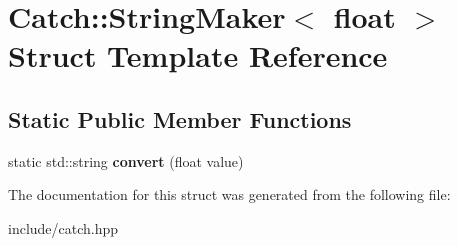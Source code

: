 \hypertarget{structCatch_1_1StringMaker_3_01float_01_4}{}\section{Catch\+:\+:String\+Maker$<$ float $>$ Struct Template Reference}
\label{structCatch_1_1StringMaker_3_01float_01_4}
\subsection*{Static Public Member Functions}
\begin{DoxyCompactItemize}
\item 
static std\+::string {\bfseries convert} (float value)\hypertarget{structCatch_1_1StringMaker_3_01float_01_4_a7ffacc6fa46a338200f3fbb2ee078648}{}\label{structCatch_1_1StringMaker_3_01float_01_4_a7ffacc6fa46a338200f3fbb2ee078648}

\end{DoxyCompactItemize}


The documentation for this struct was generated from the following file\+:\begin{DoxyCompactItemize}
\item 
include/catch.\+hpp\end{DoxyCompactItemize}
